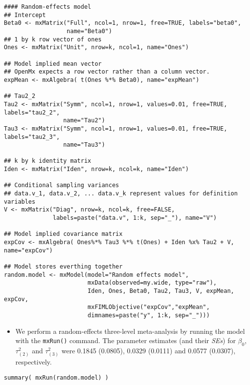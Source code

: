 \documentclass[11pt]{article}
\begin{document}
\begin{verbatim}
#### Random-effects model  
## Intercept
Beta0 <- mxMatrix("Full", ncol=1, nrow=1, free=TRUE, labels="beta0", 
                  name="Beta0")
## 1 by k row vector of ones
Ones <- mxMatrix("Unit", nrow=k, ncol=1, name="Ones")

## Model implied mean vector 
## OpenMx expects a row vector rather than a column vector.
expMean <- mxAlgebra( t(Ones %*% Beta0), name="expMean")

## Tau2_2
Tau2 <- mxMatrix("Symm", ncol=1, nrow=1, values=0.01, free=TRUE, labels="tau2_2", 
                 name="Tau2")
Tau3 <- mxMatrix("Symm", ncol=1, nrow=1, values=0.01, free=TRUE, labels="tau2_3", 
                 name="Tau3")

## k by k identity matrix
Iden <- mxMatrix("Iden", nrow=k, ncol=k, name="Iden")

## Conditional sampling variances
## data.v_1, data.v_2, ... data.v_k represent values for definition variables
V <- mxMatrix("Diag", nrow=k, ncol=k, free=FALSE, 
              labels=paste("data.v", 1:k, sep="_"), name="V")

## Model implied covariance matrix
expCov <- mxAlgebra( Ones%*% Tau3 %*% t(Ones) + Iden %x% Tau2 + V, name="expCov")

## Model stores everthing together
random.model <- mxModel(model="Random effects model", 
                        mxData(observed=my.wide, type="raw"), 
                        Iden, Ones, Beta0, Tau2, Tau3, V, expMean, expCov,
                        mxFIMLObjective("expCov","expMean", 
                        dimnames=paste("y", 1:k, sep="_")))
\end{verbatim}

\begin{itemize}
\item We perform a random-effects three-level meta-analysis by running the model with the \texttt{mxRun()} command. The parameter estimates (and their \emph{SEs}) for \(\beta_0\), \(\tau^2_{(2)}\) and \(\tau^2_{(3)}\) were 0.1845 (0.0805), 0.0329 (0.0111) and 0.0577 (0.0307), respectively.
\end{itemize}
\begin{verbatim}
summary( mxRun(random.model) )
\end{verbatim}
\end{document}
